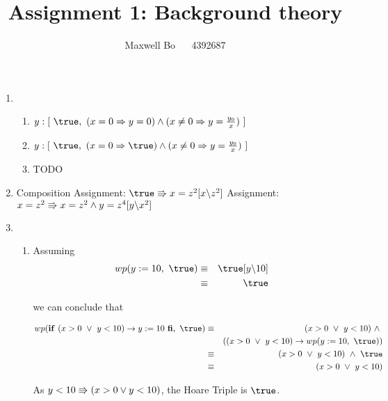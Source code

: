 \documentclass{article}
\title{\bf Assignment 1: Background theory}
\author{Maxwell Bo  ~~ 4392687}
\begin{document}
\maketitle

\begin{enumerate}
\item 
    \begin{enumerate}
    \item $y: [\ \true,\ (x = 0 \Rightarrow y = 0) \land (x \neq 0  \Rightarrow y = \frac{y_0}{x})\ ]$
    \item $y: [\ \true,\ (x = 0 \Rightarrow \true) \land (x \neq 0  \Rightarrow y = \frac{y_0}{x})\ ]$
    \item TODO
    \end{enumerate}

\item 
    \DERIVE
     {Composition}
     {Assignment: $\true \entails x = z^2 [x \backslash z^2]$}
     {Assignment: $x = z^2 \Rrightarrow x = z^2 \land y = z ^ 4[y \backslash x^2]$}
    \ENDDERIVE

\item
    \begin{enumerate}
    \item Assuming
        \begin{eqnarray*}
            wp(y := 10,\ \true) & \equiv & \true[y \backslash 10]\\
                               & \equiv & \true
        \end{eqnarray*} 

        we can conclude that 

        \begin{eqnarray*}
            wp(\If~ (x > 0 ~\lor~ y < 10) \rightarrow y:= 10\ \Fi,\ \true) & \equiv & (x > 0 ~\lor~ y < 10) ~\land~ \\
                & & ((x > 0 ~\lor~ y < 10) \rightarrow wp(y := 10,\ \true))\\
            & \equiv & (x > 0 ~\lor~ y < 10) ~\land~ \true\\
            & \equiv & (x > 0 ~\lor~ y < 10)
        \end{eqnarray*}

        As $y < 10 \Rrightarrow (x > 0 \lor y < 10)$, the Hoare Triple is $\true$.


\end{enumerate}
\end{enumerate}
\end{document}
